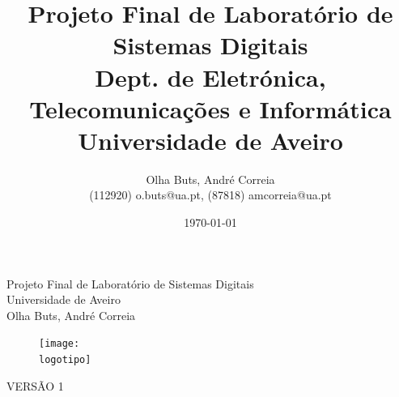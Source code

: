 \documentclass{report}
\begin{document}
%
\def\titulo{Projeto Final de Laboratório de Sistemas Digitais}
\def\data{01 de Junho de 2023}
\def\autores{Olha Buts, André Correia}
\def\autorescontactos{(112920) o.buts@ua.pt, (87818) amcorreia@ua.pt}
\def\versao{VERSÃO 1}
\def\departamento{Dept. de Eletrónica, Telecomunicações e Informática}
\def\empresa{Universidade de Aveiro}
\def\logotipo{ua.pdf}
%
%
\begin{titlepage}

\begin{center}
%
\vspace*{50mm}
%
{\Huge \titulo}\\ 
%
\vspace{10mm}
%
{\Large \empresa}\\
%
\vspace{10mm}
%
{\LARGE \autores}\\ 
%
\vspace{30mm}
%
\begin{figure}[h]
\center
\texttt{[image: \\logotipo]}
\end{figure}
%
\vspace{30mm}
\end{center}
%
\begin{flushright}
\versao
\end{flushright}
\end{titlepage}

\title{%
{\Huge\textbf{\titulo}}\\
{\Large \departamento\\ \empresa}
}
%
\author{%
    \autores \\
    \autorescontactos
}
%
\date{\today}
%
\maketitle



\end{document}
